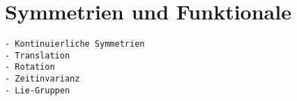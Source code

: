 %
%
%
\section{Symmetrien und Funktionale
\label{buch:symmetrien:section:symmetrie}}

\begin{verbatim}
- Kontinuierliche Symmetrien
- Translation
- Rotation
- Zeitinvarianz
- Lie-Gruppen
\end{verbatim}
